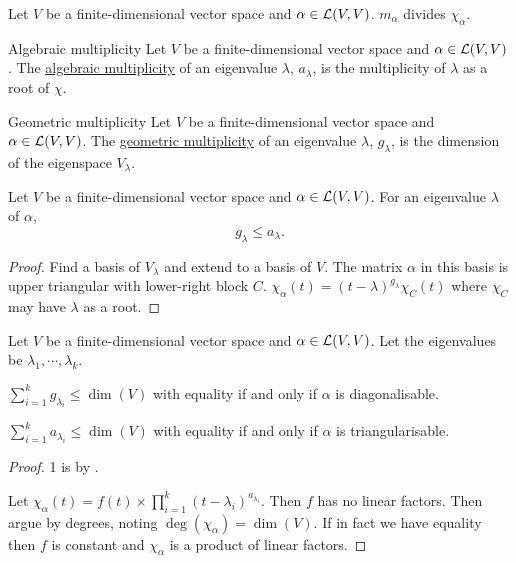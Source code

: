 \documentclass[../Main.tex]{subfiles}
\begin{document}
\begin{corollary}
    Let $V$ be a finite-dimensional vector space and $\alpha \in \mathcal{L}(V, V)$. $m_\alpha$ divides $\chi_\alpha$.
    \label{corCharDividesMinPoly}
\end{corollary}
\begin{definition}{Algebraic multiplicity}
    Let $V$ be a finite-dimensional vector space and $\alpha \in \mathcal{L}(V, V)$. The \underline{algebraic multiplicity} of an eigenvalue $\lambda$, $a_\lambda$, is the multiplicity of $\lambda$ as a root of $\chi$.
\end{definition}
\begin{definition}{Geometric multiplicity}
    Let $V$ be a finite-dimensional vector space and $\alpha \in \mathcal{L}(V, V)$. The \underline{geometric multiplicity} of an eigenvalue $\lambda$, $g_\lambda$, is the dimension of the eigenspace $V_\lambda$.
\end{definition}
\begin{proposition}
    Let $V$ be a finite-dimensional vector space and $\alpha \in \mathcal{L}(V, V)$. For an eigenvalue $\lambda$ of $\alpha$,
    \begin{equation*}
        g_\lambda \leq a_\lambda.
    \end{equation*}
    \label{thmAMGM}
\end{proposition}
\begin{proof}
    Find a basis of $V_\lambda$ and extend to a basis of $V$. The matrix $\alpha$ in this basis is upper triangular with lower-right block $C$. $\chi_\alpha(t) = (t - \lambda)^{g_\lambda} \chi_C(t)$ where $\chi_C$ may have $\lambda$ as a root.
\end{proof}
\begin{propositions}{
        Let $V$ be a finite-dimensional vector space and $\alpha \in \mathcal{L}(V, V)$. Let the eigenvalues be $\lambda_1, \cdots, \lambda_k$.
        \label{propsDiagTriAMGM}
    }
    \item $\sum_{i=1}^{k} g_{\lambda_i} \leq \dim(V)$ with equality if and only if $\alpha$ is diagonalisable. \label{propDiagAMGM}
    \item $\sum_{i=1}^{k} a_{\lambda_i} \leq \dim(V)$ with equality if and only if $\alpha$ is triangularisable. \label{propTriAMGM}
\end{propositions}
\begin{proof}
    1 is by .

    Let $\chi_\alpha(t) = f(t) \times \prod_{i=1}^k (t - \lambda_i)^{a_{\lambda_i}}$. Then $f$ has no linear factors. Then argue by degrees, noting $\deg(\chi_{\alpha}) = \dim(V)$. If in fact we have equality then $f$ is constant and $\chi_\alpha$ is a product of linear factors.
\end{proof}
\end{document}
